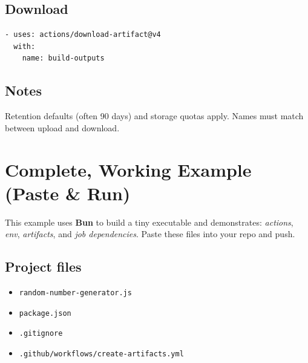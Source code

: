 \documentclass[11pt]{article}
\begin{document}
\subsection{Download}
\begin{verbatim}
- uses: actions/download-artifact@v4
  with:
    name: build-outputs
\end{verbatim}

\subsection{Notes}
Retention defaults (often 90 days) and storage quotas apply. Names must match between upload and download.

\section{Complete, Working Example (Paste \& Run)}
This example uses \textbf{Bun} to build a tiny executable and demonstrates:
\emph{actions}, \emph{env}, \emph{artifacts}, and \emph{job dependencies}. Paste these files into your repo and push.

\subsection*{Project files}
\begin{itemize}
  \item \texttt{random-number-generator.js}
  \item \texttt{package.json}
  \item \texttt{.gitignore}
  \item \texttt{.github/workflows/create-artifacts.yml}
\end{itemize}
\end{document}
